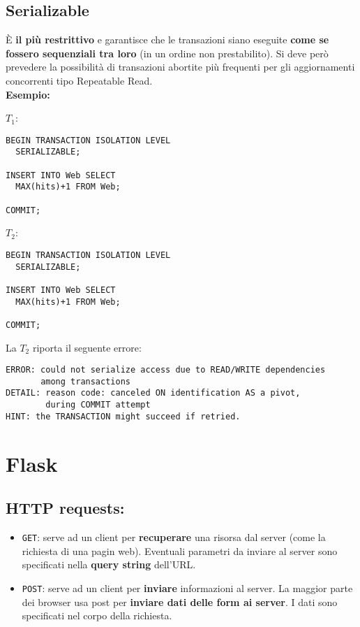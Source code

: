 \documentclass[a4paper, 10pt]{article}
\begin{document}
	\subsection{Serializable}
		È \textbf{il più restrittivo} e garantisce che le transazioni siano eseguite \textbf{come se fossero sequenziali tra loro} (in un ordine non prestabilito). Si deve però prevedere la possibilità di transazioni abortite più frequenti per gli aggiornamenti concorrenti tipo Repeatable Read.\\
		\textbf{Esempio:}
		\begin{multicols}{2}
		\noindent
		$ T_1 $:
		\begin{lstlisting}
BEGIN TRANSACTION ISOLATION LEVEL
  SERIALIZABLE;
  
INSERT INTO Web SELECT
  MAX(hits)+1 FROM Web;

COMMIT;
		\end{lstlisting}
		\columnbreak
		$ T_2 $:
		\begin{lstlisting}
BEGIN TRANSACTION ISOLATION LEVEL
  SERIALIZABLE;

INSERT INTO Web SELECT
  MAX(hits)+1 FROM Web;

COMMIT;
		\end{lstlisting}
		\end{multicols}
		
		\newpage
		
		La $ T_2 $ riporta il seguente errore:
		\begin{lstlisting}
ERROR: could not serialize access due to READ/WRITE dependencies 
       among transactions
DETAIL: reason code: canceled ON identification AS a pivot, 
        during COMMIT attempt
HINT: the TRANSACTION might succeed if retried.
		\end{lstlisting}
	\newpage		
			
			
		
	\section{Flask}
	\lstset{language=Python}
		\subsection{HTTP requests:}
			\begin{itemize}
				\item \lstinline|GET|: serve ad un client per \textbf{recuperare} una risorsa dal server (come la richiesta di una pagin web). Eventuali parametri da inviare al server sono specificati nella \textbf{query string} dell'URL.
				\item \lstinline|POST|: serve ad un client per \textbf{inviare} informazioni al server. La maggior parte dei browser usa post per \textbf{inviare dati delle form ai server}. I dati sono specificati nel corpo della richiesta.
			\end{itemize}
\end{document}
